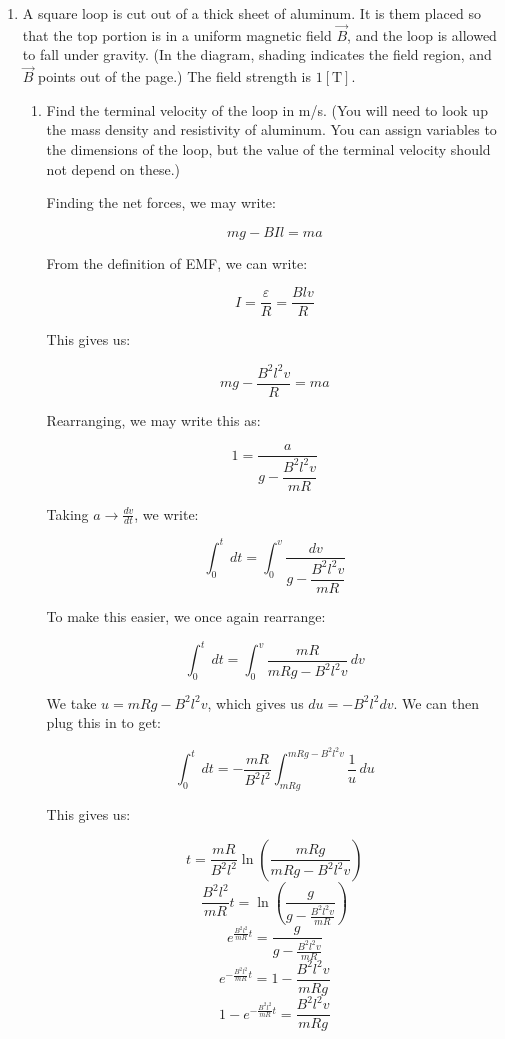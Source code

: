 \begin{enumerate}
\begin{enumerate}
    \end{enumerate}

  \item A square loop is cut out of a thick sheet of aluminum. It is them placed so that the top portion is in a uniform magnetic field $\vec{B}$, and the loop is allowed to fall under gravity. (In the diagram, shading indicates the field region, and $\vec{B}$ points out of the page.) The field strength is $1[\si{\tesla}]$.

    \begin{enumerate}

      \item Find the terminal velocity of the loop in m/s.  (You will need to look up the mass density and resistivity of aluminum. You can assign variables to the dimensions of the loop, but the value of the terminal velocity should not depend on these.)

        Finding the net forces, we may write:

        $$mg-BIl=ma$$

        From the definition of EMF, we can write:

        $$I=\frac{\varepsilon}{R}=\frac{Blv}{R}$$

        This gives us:

        $$mg-\frac{B^2l^2v}{R}=ma$$

        Rearranging, we may write this as:

        $$1=\frac{a}{g-\dfrac{B^2l^2v}{mR}}$$

        Taking $a\to\frac{dv}{dt}$, we write:

        $$\int_0^t\,dt=\int_0^v\frac{dv}{g-\dfrac{B^2l^2v}{mR}}$$

        To make this easier, we once again rearrange:

        $$\int_0^t\,dt=\int_0^v\frac{mR}{mRg-B^2l^2v}\,dv$$

        We take $u=mRg-B^2l^2v$, which gives us $du=-B^2l^2dv$. We can then plug this in to get:

        $$\int_0^t\,dt=-\frac{mR}{B^2l^2}\int_{mRg}^{mRg-B^2l^2v}\frac{1}{u}\,du$$

        This gives us:

        $$t=\frac{mR}{B^2l^2}\ln\left(  \frac{mRg}{mRg-B^2l^2v}\right)$$
        $$\frac{B^2l^2}{mR}t=\ln\left(  \frac{g}{g-\frac{B^2l^2v}{mR}}\right)$$
        $$e^{\frac{B^2l^2}{mR}t}=\frac{g}{g-\frac{B^2l^2v}{mR}}$$
        $$e^{-\frac{B^2l^2}{mR}t}=1-\frac{B^2l^2v}{mRg}$$
        $$1-e^{-\frac{B^2l^2}{mR}t}=\frac{B^2l^2v}{mRg}$$


\end{enumerate}
\end{enumerate}
